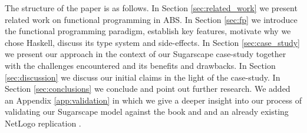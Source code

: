 The structure of the paper is as follows. 
In Section \ref{sec:related_work} we present related work on functional programming in ABS. 
In Section \ref{sec:fp} we introduce the functional programming paradigm, establish key features, motivate why we chose Haskell, discuss its type system and side-effects. 
In Section \ref{sec:case_study} we present our approach in the context of our Sugarscape case-study together with the challenges encountered and its benefits and drawbacks.
In Section \ref{sec:discussion} we discuss our initial claims in the light of the case-study.
In Section \ref{sec:conclusions} we conclude and point out further research.
We added an Appendix \ref{app:validation} in which we give a deeper insight into our process of validating our Sugarscape model against the book and \cite{epstein_growing_1996} and an already existing NetLogo replication \cite{weaver_replicating_nodate}.
